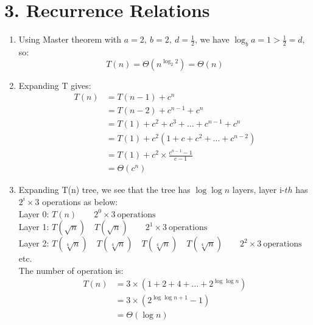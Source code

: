 \documentclass[11pt]{article}
\newcommand{\disp}{\displaystyle}
\newenvironment{qparts}{\begin{enumerate}[{(}a{)}]}{\end{enumerate}}
\begin{document}
\newpage
\section*{3. Recurrence Relations}
\begin{qparts}
\item
Using Master theorem with $\disp a=2,\ b=2,\ d=\frac{1}{2}$, we have $\log_b a = 1 > \frac{1}{2} = d$, so:
%
\begin{equation}
	T(n) = \Theta(n^{\log_2 2}) =  \Theta(n)
\end{equation}
%

\item
Expanding T gives:
%
\begin{align*}
	T(n) &= T(n-1) + c^n \\
	&= T(n-2) + c^{n-1} + c^n \\
	&= T(1) + c^2 + c^3 + \dots + c^{n-1} + c^n \\
	&= T(1) + c^2(1 + c + c^2 + \dots + c^{n-2}) \\
	&= T(1) + c^2\times\frac{c^{n-1} -1}{c - 1} \\
	&= \Theta(c^n)
\end{align*}
%

\item
Expanding T(n) tree, we see that the tree has $\log\log n$ layers, layer i-$th$ has $2^i\times 3$ operations as below: \\
Layer 0: $T(n)\qquad 2^0\times 3\ \text{operations}$ \\
Layer 1: $T(\sqrt{n})\quad T(\sqrt{n})\qquad 2^1\times 3\ \text{operations}$ \\
Layer 2: $T(\sqrt[4]{n})\quad T(\sqrt[4]{n})\quad T(\sqrt[4]{n})\quad T(\sqrt[4]{n})\qquad 2^2\times 3\ \text{operations}$ \\
etc. \\
The number of operation is:
%
\begin{align*}
	T(n) &= 3\times\left(1 + 2 + 4 + \dots + 2^{\log\log n}\right) \\
	&= 3\times\left(2^{\log\log n +1} - 1\right) \\
	&= \Theta(\log n)
\end{align*}
%

\end{qparts}


\newpage
\end{document}

